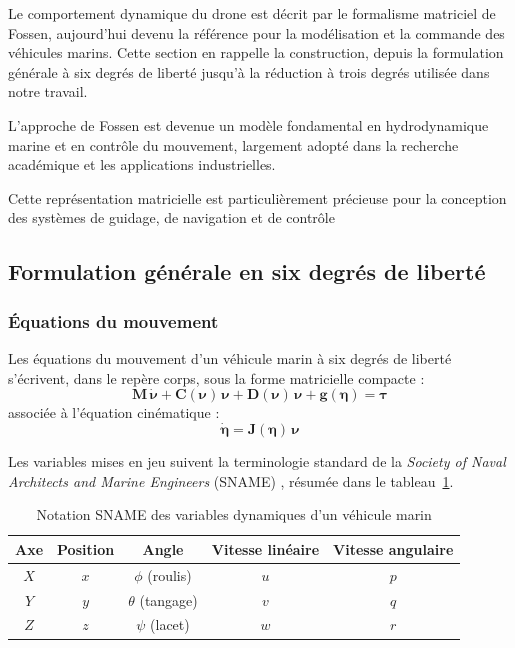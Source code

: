 \documentclass{rapportEILCO}
\begin{document}
	Le comportement dynamique du drone est décrit par le formalisme matriciel de Fossen, aujourd'hui
	devenu la référence pour la modélisation et la commande des véhicules marins. Cette section en
	rappelle la construction, depuis la formulation générale à six degrés de liberté jusqu'à la
	réduction à trois degrés utilisée dans notre travail.
	
	L'approche de Fossen est devenue un modèle fondamental en hydrodynamique marine et en
	contrôle du mouvement, largement adopté dans la recherche académique et les applications
	industrielles.
	
	Cette représentation matricielle est particulièrement précieuse pour la conception des systèmes de
	guidage, de navigation et de contrôle
	
	\subsection{Formulation générale en six degrés de liberté}
	
	\subsubsection{Équations du mouvement}
	
	Les équations du mouvement d'un véhicule marin à six degrés de liberté s'écrivent, dans le repère
	corps, sous la forme matricielle compacte :
	\begin{equation}
		\boldsymbol{M}\,\dot{\boldsymbol{\nu}} + \boldsymbol{C}(\boldsymbol{\nu})\,\boldsymbol{\nu}
		+ \boldsymbol{D}(\boldsymbol{\nu})\,\boldsymbol{\nu} + \boldsymbol{g}(\boldsymbol{\eta})
		= \boldsymbol{\tau}
		\label{eq:fossen6dof}
	\end{equation}
	associée à l'équation cinématique :
	\begin{equation}
		\dot{\boldsymbol{\eta}} = \boldsymbol{J}(\boldsymbol{\eta})\,\boldsymbol{\nu}
		\label{eq:cinematique}
	\end{equation}
	
	Les variables mises en jeu suivent la terminologie standard de la \emph{Society of Naval Architects
		and Marine Engineers} (SNAME) \cite{sname}, résumée dans le tableau~\ref{tab:sname}.
	
	\begin{table}[H]
		\centering
		\caption{Notation SNAME des variables dynamiques d'un véhicule marin}
		\label{tab:sname}
		\begin{tabular}{ccccc}
			\toprule
			\textbf{Axe} & \textbf{Position} & \textbf{Angle} & \textbf{Vitesse linéaire}
			& \textbf{Vitesse angulaire} \\
			\midrule
			$X$ & $x$ & $\phi$ (roulis) & $u$ & $p$ \\
			$Y$ & $y$ & $\theta$ (tangage) & $v$ & $q$ \\
			$Z$ & $z$ & $\psi$ (lacet) & $w$ & $r$ \\
			\bottomrule
		\end{tabular}
	\end{table}
	
\end{document}
